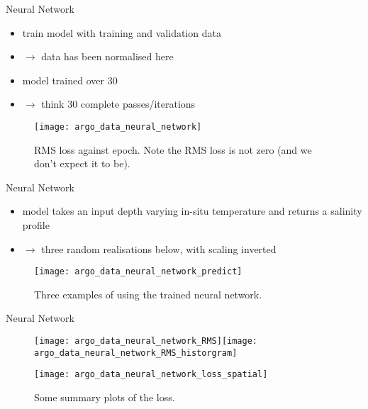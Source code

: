 \documentclass[xcolor=x11names,compress]{beamer}
\renewcommand{\(}{\begin{columns}}
\renewcommand{\)}{\end{columns}}
\newcommand{\<}[1]{\begin{column}{#1}}
\renewcommand{\>}{\end{column}}
\begin{document}

\begin{frame}{Neural Network}

\begin{itemize}
  \item train model with training and validation data
  \item[] $\to$ data has been normalised here
  \item model trained over 30 
  \item[] $\to$ think 30 complete passes/iterations
\end{itemize}

\begin{figure}
  \texttt{[image: argo\_data\_neural\_network]}
  \caption{RMS loss against epoch. Note the RMS loss is not zero (and we don't
  expect it to be).}
\end{figure}

\end{frame}


\begin{frame}{Neural Network}

\begin{itemize}
  \item model takes an input depth varying {\tiny in-situ} temperature and
  returns a salinity profile
  \item[] $\to$ three random realisations below, with scaling inverted
\end{itemize}

\begin{figure}
  \texttt{[image: argo\_data\_neural\_network\_predict]}
  \caption{Three examples of using the trained neural network.}
\end{figure}

\end{frame}


\begin{frame}{Neural Network}

\begin{figure}
  \texttt{[image: argo\_data\_neural\_network\_RMS]}\texttt{[image: argo\_data\_neural\_network\_RMS\_historgram]} 
  
  \texttt{[image: argo\_data\_neural\_network\_loss\_spatial]}
  \caption{Some summary plots of the loss.}
\end{figure}

\end{frame}
\end{document}
